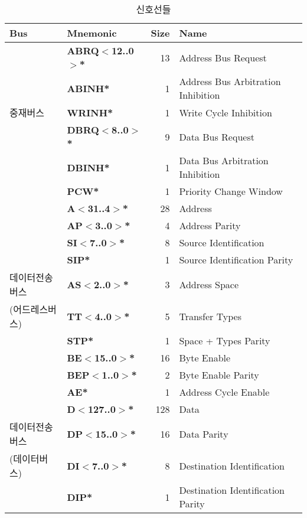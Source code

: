 %
%
\begin{table}[htbp]
\caption{신호선들}\label{table:signals}
   \begin{center}
\begingroup
\setlength{\tabcolsep}{6pt} %
\renewcommand{\arraystretch}{0.9} %
   \begin{tabular}{|l|l|r|l|} \hline
Bus&Mnemonic & Size & Name \\ \hline \hline
     & {\bf ABRQ$<$12..0$>$*} & 13 & Address Bus Request \\
     & {\bf ABINH*}                    & 1 & Address Bus Arbitration Inhibition \\
중재버스 & {\bf WRINH*}                    & 1 & Write Cycle Inhibition \\
     & {\bf DBRQ$<$8..0$>$*}  & 9 & Data Bus Request \\
     & {\bf DBINH*}                    & 1 & Data Bus Arbitration Inhibition \\
     & {\bf PCW*}                      & 1 & Priority Change Window \\ \hline
         & {\bf A$<$31..4$>$*}     & 28 & Address \\
         & {\bf AP$<$3..0$>$*}     & 4 & Address Parity \\
         & {\bf SI$<$7..0$>$*}     & 8 & Source Identification \\
         & {\bf SIP*}                      & 1 & Source Identification Parity \\
데이터전송버스  & {\bf AS$<$2..0$>$*}     & 3 & Address Space \\
(어드레스버스) & {\bf TT$<$4..0$>$*}     & 5 & Transfer Types \\
         & {\bf STP*}                      & 1 & Space + Types Parity \\
         & {\bf BE$<$15..0$>$*}    & 16 & Byte Enable \\
         & {\bf BEP$<$1..0$>$*}    & 2 & Byte Enable Parity \\
         & {\bf AE*}                       & 1 & Address Cycle Enable \\ \hline
         & {\bf D$<$127..0$>$*}    & 128 & Data \\
데이터전송버스  & {\bf DP$<$15..0$>$*}    & 16 & Data Parity \\
(데이터버스)  & {\bf DI$<$7..0$>$*}     & 8 & Destination Identification \\
         & {\bf DIP*}                      & 1 & Destination Identification Parity \\

\end{tabular}
\end{center}
\end{table}
